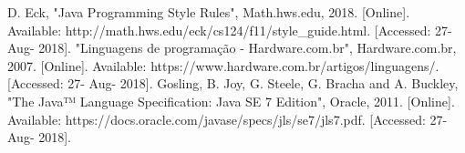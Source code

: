 \documentclass[conference]{IEEEtran}
\begin{document}
\begin{thebibliography}{00}
 D. Eck, "Java Programming Style Rules", Math.hws.edu, 2018. [Online]. Available: http://math.hws.edu/eck/cs124/f11/style\_guide.html. [Accessed: 27- Aug- 2018].
 "Linguagens de programação - Hardware.com.br", Hardware.com.br, 2007. [Online]. Available: https://www.hardware.com.br/artigos/linguagens/. [Accessed: 27- Aug- 2018].
 Gosling, B. Joy, G. Steele, G. Bracha and A. Buckley, "The Java™ Language Specification: Java SE 7 Edition", Oracle, 2011. [Online]. Available: https://docs.oracle.com/javase/specs/jls/se7/jls7.pdf. [Accessed: 27- Aug- 2018].

\end{thebibliography}
\end{document}
